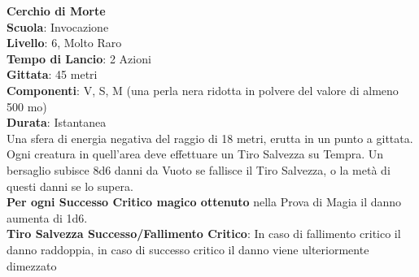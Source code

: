 \begin{multicols}{2}
\medskip\textbf{Cerchio di Morte}\\
\textbf{Scuola}: Invocazione\\
\textbf{Livello}: 6, Molto Raro\\
\textbf{Tempo di Lancio}: 2 Azioni\\
\textbf{Gittata}: 45 metri\\
\textbf{Componenti}: V, S, M (una perla nera ridotta in polvere del valore di almeno 500 mo)\\
\textbf{Durata}: Istantanea\\
Una sfera di energia negativa del raggio di 18 metri, erutta in un punto a gittata. Ogni creatura in quell'area deve effettuare un Tiro Salvezza su Tempra. Un bersaglio subisce 8d6 danni da Vuoto se fallisce il Tiro Salvezza, o la metà di questi danni se lo supera. \\
\textbf{Per ogni Successo Critico magico ottenuto} nella Prova di Magia il danno aumenta di 1d6.\\
\textbf{Tiro Salvezza Successo/Fallimento Critico}: In caso di fallimento critico il danno raddoppia, in caso di successo critico il danno viene ulteriormente dimezzato


\end{multicols}
